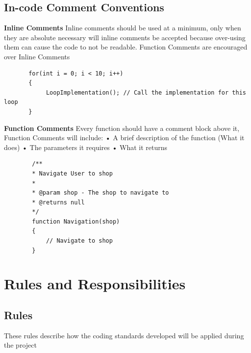 \documentclass{article}
\begin{document}
\subsection{In-code Comment Conventions}
    \indent \textbf{Inline Comments}
    Inline comments should be used at a minimum, only \indent when they are absolute necessary will inline comments be accepted because \indent over-using them can cause the code to not be readable. Function Comments \indent are encouraged over Inline Comments
    \begin{lstlisting}
       for(int i = 0; i < 10; i++)
       {
            LoopImplementation(); // Call the implementation for this loop
       }
    \end{lstlisting}
    
    
    \indent \textbf{Function Comments}
    Every function should have a comment block above \indent it, Function Comments will include:\newline
 \indent \indent•	A brief description of the function (What it does)\newline
 \indent \indent•	The parameters it requires\newline
 \indent \indent•	What it returns\newline
    \begin{lstlisting}
        /**
        * Navigate User to shop
        * 
        * @param shop - The shop to navigate to
        * @returns null
        */
        function Navigation(shop)
        {
            // Navigate to shop
        }
    \end{lstlisting}


\section{Rules and Responsibilities}
\subsection{Rules}
These rules describe how the coding standards developed will be applied during the project
\end{document}
